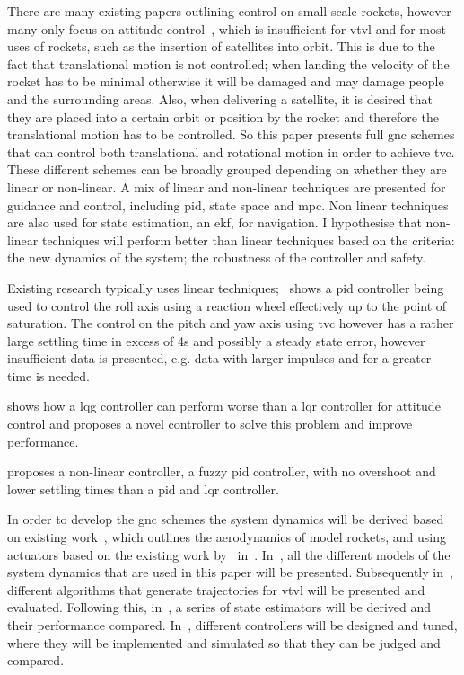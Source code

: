 There are many existing papers outlining control on small scale rockets, however many only focus on \gls{attitude} control~\cite{Kisabo2019, Kehl2015, Sumathi2014}, which is insufficient for \gls{vtvl} and for most uses of rockets, such as the insertion of satellites into orbit. 
This is due to the fact that translational motion is not controlled; when landing the velocity of the rocket has to be minimal otherwise it will be damaged and may damage people and the surrounding areas. 
Also, when delivering a satellite, it is desired that they are placed into a certain orbit or position by the rocket and therefore the translational motion has to be controlled. 
So this paper presents full \gls{gnc} schemes that can control both translational and rotational motion in order to achieve \gls{tvc}.
These different schemes can be broadly grouped depending on whether they are linear or non-linear.
A mix of linear and non-linear techniques are presented for guidance and control, including \gls{pid}, state space and \gls{mpc}. 
Non linear techniques are also used for state estimation, an \gls{ekf}, for navigation.
I hypothesise that non-linear techniques will perform better than linear techniques based on the criteria: the new dynamics of the system; the robustness of the controller and safety.

Existing research typically uses linear techniques;~\cite{Kehl2015} shows a \gls{pid} controller being used to control the roll axis using a reaction wheel effectively up to the point of saturation.
The control on the pitch and yaw axis using \gls{tvc} however has a rather large settling time in excess of 4s and possibly a steady state error, however insufficient data is presented, e.g. data with larger impulses and for a greater time is needed.

\cite{Kisabo2019} shows how a \gls{lqg} controller can perform worse than a \gls{lqr} controller for \gls{attitude} control and proposes a novel controller to solve this problem and improve performance.

\cite{Sumathi2014} proposes a non-linear controller, a fuzzy \gls{pid} controller, with no overshoot and lower settling times than a \gls{pid} and \gls{lqr} controller.

In order to develop the \gls{gnc} schemes the system dynamics will be derived based on existing work~\cite{OR}, which outlines the aerodynamics of model rockets, and using actuators based on the existing work by~\cite{BPS} in~.
In~, all the different models of the system dynamics that are used in this paper will be presented.
Subsequently in~, different algorithms that generate trajectories for \gls{vtvl} will be presented and evaluated.
Following this, in~, a series of state estimators will be derived and their performance compared.
In~, different controllers will be designed and tuned, where they will be implemented and simulated so that they can be judged and compared.

